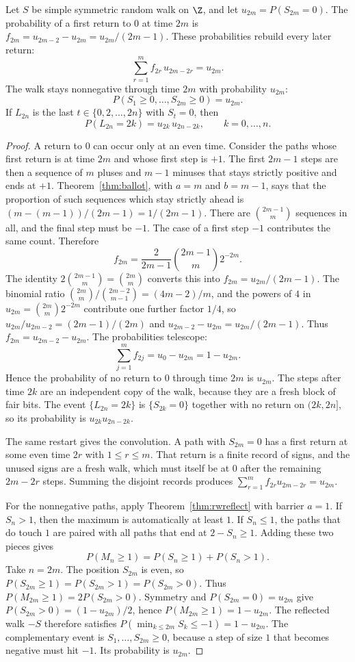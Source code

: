 \begin{theorem}\label{thm:arcsine}
Let $S$ be simple symmetric random walk on $\Z$, and let $u_{2m}=P(S_{2m}=0)$. The probability of a first return to $0$ at time $2m$ is $f_{2m}=u_{2m-2}-u_{2m}=u_{2m}/(2m-1)$. These probabilities rebuild every later return:
\[
 \sum_{r=1}^{m}f_{2r}\,u_{2m-2r}=u_{2m}.
\]
The walk stays nonnegative through time $2m$ with probability $u_{2m}$:
\[
 P(S_1\ge0,\ldots,S_{2m}\ge0)=u_{2m}.
\]
If $L_{2n}$ is the last $t\in\{0,2,\ldots,2n\}$ with $S_t=0$, then
\[
 P(L_{2n}=2k)=u_{2k}\,u_{2n-2k},\qquad k=0,\ldots,n.
\]
\end{theorem}
\begin{proof}
A return to $0$ can occur only at an even time. Consider the paths whose first return is at time $2m$ and whose first step is $+1$. The first $2m-1$ steps are then a sequence of $m$ pluses and $m-1$ minuses that stays strictly positive and ends at $+1$. Theorem~\ref{thm:ballot}, with $a=m$ and $b=m-1$, says that the proportion of such sequences which stay strictly ahead is $(m-(m-1))/(2m-1)=1/(2m-1)$. There are $\binom{2m-1}{m}$ sequences in all, and the final step must be $-1$. The case of a first step $-1$ contributes the same count. Therefore
\[
 f_{2m}=\frac{2}{2m-1}\binom{2m-1}{m}2^{-2m}.
\]
The identity $2\binom{2m-1}{m}=\binom{2m}{m}$ converts this into $f_{2m}=u_{2m}/(2m-1)$. The binomial ratio $\binom{2m}{m}/\binom{2m-2}{m-1}=(4m-2)/m$, and the powers of $4$ in $u_{2m}=\binom{2m}{m}2^{-2m}$ contribute one further factor $1/4$, so $u_{2m}/u_{2m-2}=(2m-1)/(2m)$ and $u_{2m-2}-u_{2m}=u_{2m}/(2m-1)$. Thus $f_{2m}=u_{2m-2}-u_{2m}$. The probabilities telescope:
\[
 \sum_{j=1}^{m}f_{2j}=u_0-u_{2m}=1-u_{2m}.
\]
Hence the probability of no return to $0$ through time $2m$ is $u_{2m}$. The steps after time $2k$ are an independent copy of the walk, because they are a fresh block of fair bits. The event $\{L_{2n}=2k\}$ is $\{S_{2k}=0\}$ together with no return on $(2k,2n]$, so its probability is $u_{2k}u_{2n-2k}$.

The same restart gives the convolution. A path with $S_{2m}=0$ has a first return at some even time $2r$ with $1\le r\le m$. That return is a finite record of signs, and the unused signs are a fresh walk, which must itself be at $0$ after the remaining $2m-2r$ steps. Summing the disjoint records produces $\sum_{r=1}^m f_{2r}u_{2m-2r}=u_{2m}$.

For the nonnegative paths, apply Theorem~\ref{thm:rwreflect} with barrier $a=1$. If $S_n>1$, then the maximum is automatically at least $1$. If $S_n\le 1$, the paths that do touch $1$ are paired with all paths that end at $2-S_n\ge 1$. Adding these two pieces gives
\[
 P(M_n\ge 1)=P(S_n\ge 1)+P(S_n>1).
\]
Take $n=2m$. The position $S_{2m}$ is even, so $P(S_{2m}\ge 1)=P(S_{2m}>1)=P(S_{2m}>0)$. Thus $P(M_{2m}\ge 1)=2P(S_{2m}>0)$. Symmetry and $P(S_{2m}=0)=u_{2m}$ give $P(S_{2m}>0)=(1-u_{2m})/2$, hence $P(M_{2m}\ge 1)=1-u_{2m}$. The reflected walk $-S$ therefore satisfies $P(\min_{k\le 2m}S_k\le -1)=1-u_{2m}$. The complementary event is $S_1,\ldots,S_{2m}\ge 0$, because a step of size $1$ that becomes negative must hit $-1$. Its probability is $u_{2m}$.
\end{proof}

